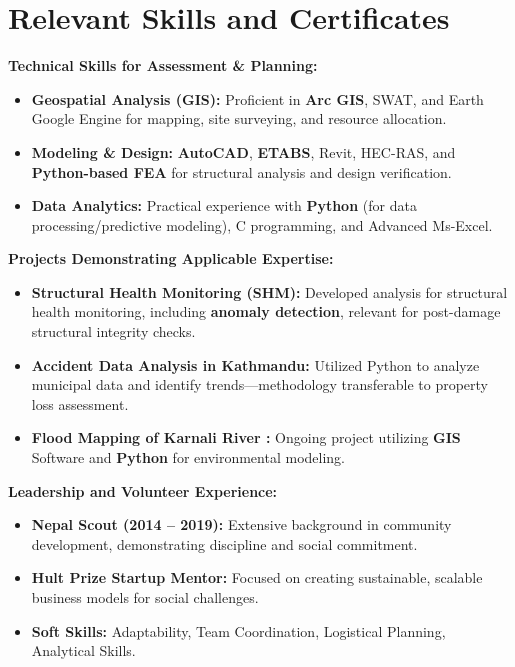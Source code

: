 \documentclass[letterpaper,10pt]{article}
\begin{document}
\section*{Relevant Skills and Certificates}

\noindent\textbf{Technical Skills for Assessment \& Planning:}
\begin{itemize}
    \item \textbf{Geospatial Analysis (GIS):} Proficient in \textbf{Arc GIS}, {SWAT}, and {Earth Google Engine} for mapping, site surveying, and resource allocation.
    \item \textbf{Modeling \& Design:} \textbf{AutoCAD}, \textbf{ETABS}, Revit, HEC-RAS, and \textbf{Python-based FEA} for structural analysis and design verification.
    \item \textbf{Data Analytics:} Practical experience with \textbf{Python} (for data processing/predictive modeling), C programming, and Advanced Ms-Excel.
\end{itemize}

\noindent\textbf{Projects Demonstrating Applicable Expertise:}
\begin{itemize}
    \item \textbf{Structural Health Monitoring (SHM):} Developed analysis for structural health monitoring, including \textbf{anomaly detection}, relevant for post-damage structural integrity checks.
    \item \textbf{Accident Data Analysis in Kathmandu:} Utilized Python to analyze municipal data and identify trends—methodology transferable to property loss assessment.
    \item \textbf{Flood Mapping of Karnali River :} Ongoing project utilizing \textbf{GIS} Software and \textbf{Python} for environmental modeling.
\end{itemize}

\noindent\textbf{Leadership and Volunteer Experience:}
\begin{itemize}
    \item \textbf{Nepal Scout (2014 – 2019):} Extensive background in community development, demonstrating discipline and social commitment.
    \item \textbf{Hult Prize Startup Mentor:} Focused on creating sustainable, scalable business models for social challenges.
    \item \textbf{Soft Skills:} Adaptability, Team Coordination, Logistical Planning, Analytical Skills.
\end{itemize}
\end{document}
